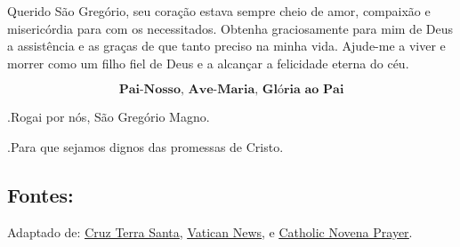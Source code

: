 \documentclass[a4paper,14pt]{extarticle} \usepackage[utf8]{inputenc}
\makeatletter
\newcommand{\vers@resp@sym}{%
  \raisebox{0.2ex}{\rotatebox[origin=c]{-20}{$\m@th\rceil$}}%
}
\newcommand{\vers@resp}[2]{%
  {\ooalign{%
     \hidewidth\kern#1\vers@resp@sym\hidewidth\cr
     #2\cr
  }}%
}
\DeclareRobustCommand{\versicle}{\vers@resp{-0.1em}{V}}
\DeclareRobustCommand{\response}{\vers@resp{0pt}{R}}
\makeatother
\begin{document}
Querido São Gregório, seu coração estava sempre cheio de amor, compaixão e misericórdia 
para com os necessitados. Obtenha graciosamente para mim de Deus a assistência 
e as graças de que tanto preciso na minha vida. Ajude-me a viver e morrer como um 
filho fiel de Deus e a alcançar a felicidade eterna do céu.


\[
  \textbf{Pai-Nosso, Ave-Maria, Glória ao Pai}
\]

\response.\quad Rogai por nós, São Gregório Magno.

\versicle.\quad Para que sejamos dignos das promessas de Cristo.

\vfill

\begin{center}
\subsection*{Fontes:}
Adaptado de: \underline{\href{https://cruzterrasanta.com.br/oracao-terco-de-sao-gregorio-magno/259/105/}{Cruz Terra Santa}}, \underline{\href{https://www.vaticannews.va/pt/santo-do-dia/09/03/s--gregorio-magno--papa-e-doutor-da-igreja.html}{Vatican News}}, e  \underline{\href{https://catholicnovenaprayer.com/st-gregory-the-great-novena-prayer/}{Catholic Novena Prayer}}.
\end{center}
\end{document}
